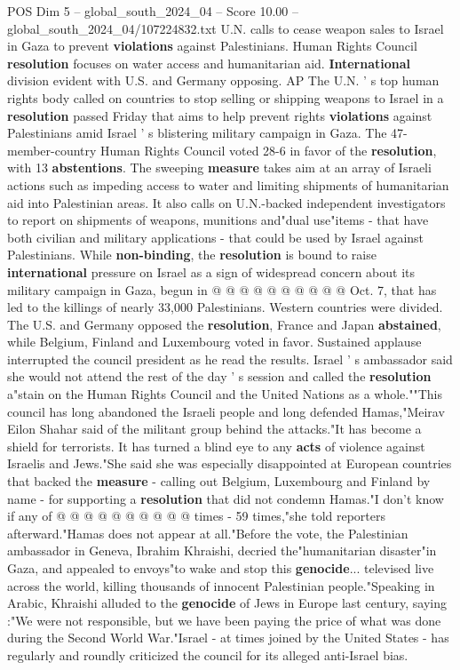 \begin{textsample}{POS Dim 5 – global\_south\_2024\_04 – Score 10.00 – global\_south\_2024\_04/107224832.txt}  \label{ex:f5_pos_276}
U.N. calls to cease weapon sales to Israel in Gaza to prevent \textbf{violations} against Palestinians.
Human Rights Council \textbf{resolution} focuses on water access and humanitarian aid. \textbf{International} division evident with U.S. and Germany opposing.
AP The U.N. ' s top human rights body called on countries to stop selling or shipping weapons to Israel in a \textbf{resolution} passed Friday that aims to help prevent rights \textbf{violations} against Palestinians amid Israel ' s blistering military campaign in Gaza.
The 47-member-country Human Rights Council voted 28-6 in favor of the \textbf{resolution}, with 13 \textbf{abstentions}.
The sweeping \textbf{measure} takes aim at an array of Israeli actions such as impeding access to water and limiting shipments of humanitarian aid into Palestinian areas.
It also calls on U.N.-backed independent investigators to report on shipments of weapons, munitions and"dual use"items - that have both civilian and military applications - that could be used by Israel against Palestinians.
While \textbf{non-binding}, the \textbf{resolution} is bound to raise \textbf{international} pressure on Israel as a sign of widespread concern about its military campaign in Gaza, begun in @ @ @ @ @ @ @ @ @ @ Oct. 7, that has led to the killings of nearly 33,000 Palestinians.
Western countries were divided.
The U.S. and Germany opposed the \textbf{resolution}, France and Japan \textbf{abstained}, while Belgium, Finland and Luxembourg voted in favor.
Sustained applause interrupted the council president as he read the results.
Israel ' s ambassador said she would not attend the rest of the day ' s session and called the \textbf{resolution} a"stain on the Human Rights Council and the United Nations as a whole.""This council has long abandoned the Israeli people and long defended Hamas,"Meirav Eilon Shahar said of the militant group behind the attacks."It has become a shield for terrorists.
It has turned a blind eye to any \textbf{acts} of violence against Israelis and Jews."She said she was especially disappointed at European countries that backed the \textbf{measure} - calling out Belgium, Luxembourg and Finland by name - for supporting a \textbf{resolution} that did not condemn Hamas."I don't know if any of @ @ @ @ @ @ @ @ @ @ times - 59 times,"she told reporters afterward."Hamas does not appear at all."Before the vote, the Palestinian ambassador in Geneva, Ibrahim Khraishi, decried the"humanitarian disaster"in Gaza, and appealed to envoys"to wake and stop this \textbf{genocide}... televised live across the world, killing thousands of innocent Palestinian people."Speaking in Arabic, Khraishi alluded to the \textbf{genocide} of Jews in Europe last century, saying :"We were not responsible, but we have been paying the price of what was done during the Second World War."Israel - at times joined by the United States - has regularly and roundly criticized the council for its alleged anti-Israel bias.

\end{textsample}
